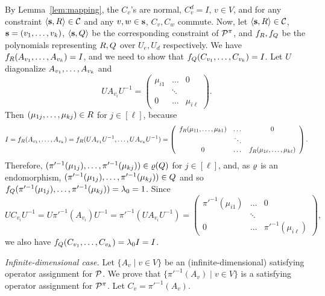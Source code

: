 By Lemma~\ref{lem:mapping}, the $C_v$'s are normal, $C_v^d=I$, $v\in V$,
and for any constraint $\langle {\bf s},R \rangle\in{\mathcal C}$ and any $v,w\in{\bf s}$, $C_v,C_w$ commute.
Now, let $\langle {\bf s},R \rangle\in{\mathcal C}$, ${\bf s}=(v _1,\ldots, v _{k})$, $\langle {\bf s},Q \rangle$ be the
corresponding constraint of ${\mathcal P}^\pi$, and $f_R,f_Q$ be the polynomials representing $R,Q$ over $U_e,U_d$ respectively. We have $f_R(A_{v_1},\ldots, A_{v_k})=I$, and we need to show that $f_Q(C_{v_1},\ldots, C_{v_k})=I$. Let $U$ diagonalize $A_{v_1},\ldots, A_{v_k}$ and
\[
UA_{v_i}U^{-1}=\left(\begin{array}{ccc}\mu_{i1}&\dots&0\\ &\ddots&\\ 0&\dots&\mu_{i\ell}\end{array}\right).
\]
Then $(\mu_{1j},\ldots,\mu_{kj})\in R$ for $j\in[\ell]$, because
\[
I=f_R(A_{v_1},\ldots, A_{v_k})=f_R(UA_{v_1}U^{-1},\ldots, UA_{v_k}U^{-1})= \left(\begin{array}{ccc}f_R(\mu_{11},\ldots,\mu_{k1})&\dots&0\\ &\ddots&\\ 0&\dots&f_R(\mu_{1\ell},\ldots,\mu_{k\ell})\end{array}\right).
\]
Therefore, $(\pi'^{-1}(\mu_{1j}),\ldots,\pi'^{-1}(\mu_{kj}))\in\varrho(Q)$ for $j\in[\ell]$, and, as $\varrho$ is an endomorphism, $(\pi'^{-1}(\mu_{1j}),\ldots,\pi'^{-1}(\mu_{kj}))\in Q$ and so $f_Q(\pi'^{-1}(\mu_{1j}),\ldots,\pi'^{-1}(\mu_{kj}))=\lambda_0=1$. Since 
\[
UC_{v_i}U^{-1}=U\pi'^{-1}(A_{v_i})U^{-1}=\pi'^{-1}(UA_{v_i}U^{-1})=\left(\begin{array}{ccc}\pi'^{-1}(\mu_{i1})&\dots&0\\ &\ddots&\\ 0&\dots&\pi'^{-1}(\mu_{i\ell})\end{array}\right),
\]
we also have $f_Q(C_{v_1},\ldots, C_{v_k})=\lambda_0I=I$.

{\it Infinite-dimensional case.}
Let $\{A_v\mid v\in V\}$ be an (infinite-dimensional) satisfying operator assignment for ${\mathcal P}$. We prove that $\{\pi'^{-1}(A_v)\mid v\in V\}$ is a satisfying operator assignment for ${\mathcal P}^\pi$. Let $C_v=\pi'^{-1}(A_v)$.

